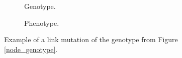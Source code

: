 \begin{figure}[htb]
    \begin{mdframed}
        \begin{subfigure}[b]{0.45\textwidth}
            \centering
            \resizebox{1\textwidth}{!}{}
            \caption{Genotype.}
            \label{link_genotype}
        \end{subfigure}
        \begin{subfigure}[b]{0.45\textwidth}
            \centering
            \resizebox{0.65\textwidth}{!}{}
            \caption{Phenotype.}
            \label{link_phenotype}
        \end{subfigure}
    \end{mdframed}
    \caption{Example of a link mutation of the genotype from Figure \ref{node_genotype}.}
    \label{link_mutation}
\end{figure}
